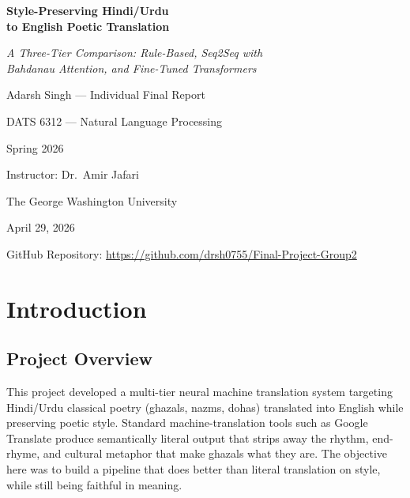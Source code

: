 \documentclass[11pt]{article}
\begin{document}
\begin{titlepage}
\centering
\vspace*{2cm}
{\Huge\bfseries Style-Preserving Hindi/Urdu \\[6pt] to English Poetic Translation\par}
\vspace{0.6cm}
{\Large\itshape A Three-Tier Comparison: Rule-Based, Seq2Seq with\\Bahdanau Attention, and Fine-Tuned Transformers\par}
\vspace{2cm}
{\Large Adarsh Singh — Individual Final Report\par}
\vspace{0.6cm}
{\large DATS 6312 --- Natural Language Processing\par}
{\large Spring 2026\par}
\vspace{0.4cm}
{\large Instructor: Dr.~Amir Jafari\par}
\vspace{2cm}
{\large The George Washington University\par}
\vspace{0.6cm}
{\large April 29, 2026\par}
\vspace{1.5cm}
{\small GitHub Repository: \url{https://github.com/drsh0755/Final-Project-Group2}\par}
\end{titlepage}

\section{Introduction}

\subsection{Project Overview}
This project developed a multi-tier neural machine translation system targeting Hindi/Urdu classical poetry (ghazals, nazms, dohas) translated into English while preserving poetic style. Standard machine-translation tools such as Google Translate produce semantically literal output that strips away the rhythm, end-rhyme, and cultural metaphor that make ghazals what they are. The objective here was to build a pipeline that does better than literal translation on style, while still being faithful in meaning.
\end{document}
